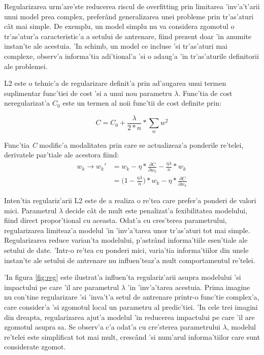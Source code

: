 \documentclass[12pt,a4paper,twoside]{report}
\begin{document}
Regularizarea urm'are'ste reducerea riscul de overfitting prin limitarea 'inv'a't'arii unui model prea complex, prefer\^and generalizarea unei probleme prin tr'as'aturi c\^at mai simple. De exemplu, un model simplu nu va considera zgomotul o tr'as'atur'a caracteristic'a a setului de antrenare, fiind prezent doar 'in anumite instan'te ale acestuia. 'In schimb, un model ce incluse 'si tr'as'aturi mai complexe, observ'a informa'tia adi'tional'a 'si o adaug'a 'in tr'as'aturile definitorii ale problemei. 

L2 este o tehnic'a de regularizare definit'a prin ad'augarea unui termen suplimentar func'tiei de cost 'si a unui nou parametru $\lambda$. Func'tia de cost neregularizat'a \textit{$C_0$} este un termen al noii func'tii de cost definite prin:

\begin{equation}
C = C_0 + \frac{\lambda}{2*n} * \sum\limits_{w} w^2
\end{equation}

Func'tia \textit{C} modific'a modalitatea prin care se actualizeaz'a ponderile re'telei, derivatele par'tiale ale acestora fiind:
\begin{equation}
\begin{split}
w_k \rightarrow w_k\prime & = w_k - \eta*\frac{\partial C}{\partial w_k} - \frac{\eta \lambda}{n} * w_k \\
& = \bigg(1 - \frac{\eta \lambda}{n}\bigg) * w_k - \eta*\frac{\partial C}{\partial w_k}
\end{split}
\end{equation}

Inten'tia regulariz'arii L2 este de a realiza o re'tea care prefer'a ponderi de valori mici. Parametrul $\lambda$ decide c\^at de mult este penalizat'a fexibilitatea modelului, fiind direct propor'tional cu aceasta. Odat'a cu cres'terea parametrului, regularizarea limiteaz'a modelul 'in 'inv'a'tarea unor tr'as'aturi tot mai simple. Regularizarea reduce varian'ta modelului, p'astr\^and informa'tiile esen'tiale ale setului de date. 'Intr-o re'tea cu ponderi mici, varia'tia informa'tiilor din unele instan'te ale setului de antrenare nu influen'teaz'a mult comportamentul re'telei.

'In figura \ref{fig:reg} este ilustrat'a influen'ta regulariz'arii asupra modelului 'si impactului pe care 'il are parametrul $\lambda$ 'in 'inv'a'tarea acestuia. Prima imagine nu con'tine regularizare 'si 'inva't'a setul de antrenare printr-o func'tie complex'a, care consider'a 'si zgomotul local un parametru al predic'tiei. 'In cele trei imagini din dreapta, regularizarea ajut'a modelul 'in reducerea impactului pe care 'il are zgomotul asupra sa. Se observ'a c'a odat'a cu cre'sterea parametrului $\lambda$, modelul re'telei este simplificat tot mai mult, cresc\^and 'si num'arul informa'tiilor care sunt considerate zgomot. 
\end{document}
